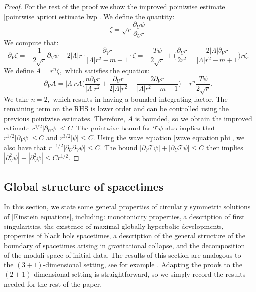 \documentclass[11pt]{article}
\numberwithin{equation}{section}
\begin{document}
\begin{proof}
    For the rest of the proof we show the improved pointwise estimate \eqref{pointwise apriori estimate lwp}. We define the quantity:
    \[\zeta=\sqrt{r}\frac{\partial_U\psi}{\partial_Ur}.\]
    We compute that:
    \[\partial_V\zeta=-\frac{1}{2\sqrt{r}}\partial_V\psi-2|\Lambda|r\cdot\frac{\partial_Vr}{|\Lambda|r^2-m+1}\cdot\zeta=-\frac{T\psi}{2\sqrt{r}}+\bigg(\frac{\partial_Ur}{2r^2}-\frac{2|\Lambda|\partial_Vr}{|\Lambda|r^2-m+1}\bigg)r\zeta.\]
    We define $A=r^n\zeta,$ which satisfies the equation:
    \[\partial_VA=|\Lambda|rA\bigg(\frac{n\partial_Vr}{|\Lambda|r^2}+\frac{\partial_Ur}{2|\Lambda|r^2}-\frac{2\partial_Vr}{|\Lambda|r^2-m+1}\bigg)-r^n\frac{T\psi}{2\sqrt{r}}.\]
    We take $n=2,$ which results in having a bounded integrating factor. The remaining term on the RHS is lower order and can be controlled using the previous pointwise estimates. Therefore, $A$ is bounded, so we obtain the improved estimate $r^{1/2}|\partial_U\psi|\leq C.$ The pointwise bound for $\mathcal{T}\psi$ also implies that $r^{1/2}|\partial_V\psi|\leq C$ and $r^{3/2}|\psi|\leq C.$ Using the wave equation \eqref{wave equation phi}, we also have that $r^{-1/2}|\partial_U\partial_V\psi|\leq C$. The bound $|\partial_V\mathcal{T}\psi|+|\partial_U\mathcal{T}\psi|\leq C$ then implies $|\partial_U^2\psi|+|\partial_V^2\psi|\leq Cr^{1/2}.$
\end{proof}

\subsection{Global structure of spacetimes}\label{global structure section}

In this section, we state some general properties of circularly symmetric solutions of \eqref{Einstein equations}, including: monotonicity properties, a description of first singularities, the existence of maximal globally hyperbolic developments, properties of black hole spacetimes, a description of the general structure of the boundary of spacetimes arising in gravitational collapse, and the decomposition of the moduli space of initial data. The results of this section are analogous to the $(3+1)$-dimensional setting, see for example \cite{Dafermos_extension,Dafermos_trapped,localwellposed,kommemi}. Adapting the proofs to the $(2+1)$-dimensional setting is straightforward, so we simply record the results needed for the rest of the paper.
\end{document}
